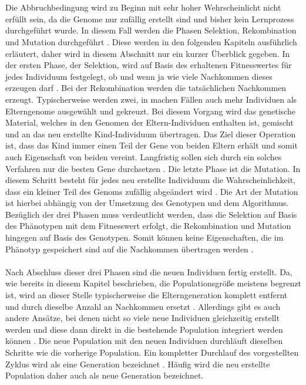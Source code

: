 \\\\
Die Abbruchbedingung wird zu Beginn mit sehr hoher Wehrscheinlicht nicht erfüllt sein, da die Genome nur zufällig erstellt sind und bisher kein Lernprozess durchgeführt wurde. In diesem Fall werden die Phasen Selektion, Rekombination und Mutation durchgeführt \cite{rothlauf2006representation}. Diese werden in den folgenden Kapiteln ausführlich erläutert, daher wird in diesem Abschnitt nur ein kurzer Überblick gegeben. In der ersten Phase, der Selektion, wird auf Basis des erhaltenen Fitnesswertes für jedes Individuum festgelegt, ob und wenn ja wie viele Nachkommen dieses erzeugen darf \cite{weicker2015evolutionare}. Bei der Rekombination werden die tatsächlichen Nachkommen erzeugt. Typischerweise werden zwei, in machen Fällen auch mehr Individuen als Elterngenome ausgewählt und gekreuzt. Bei diesem Vorgang wird das genetische Material, welches in den Genomen der Eltern-Individuen enthalten ist, gemischt und an das neu erstellte Kind-Individuum übertragen. Das Ziel dieser Operation ist, dass das Kind immer einen Teil der Gene von beiden Eltern erhält und somit auch Eigenschaft von beiden vereint. Langfristig sollen sich durch ein solches Verfahren nur die besten Gene durchsetzen \cite{weicker2015evolutionare}. 
Die letzte Phase ist die Mutation. In diesem Schritt besteht für jedes neu erstellte Individuum die Wahrscheinlichkeit, dass ein kleiner Teil des Genoms zufällig abgeändert wird \cite{rojas1996neural}. Die Art der Mutation ist hierbei abhängig von der Umsetzung des Genotypen und dem Algorithmus. Bezüglich der drei Phasen muss verdeutlicht werden, dass die Selektion auf Basis des Phänotypen mit dem Fitnesswert erfolgt, die Rekombination und Mutation hingegen auf Basis des Genotypen. Somit können keine Eigenschaften, die im Phänotyp gespeichert sind auf die Nachkommen übertragen werden \cite{rothlauf2006representation}.
\\\\
Nach Abschluss dieser drei Phasen sind die neuen Individuen fertig erstellt. Da, wie bereits in diesem Kapitel beschrieben, die Populationsgröße meistens begrenzt ist, wird an dieser Stelle typischerweise die Elterngeneration komplett entfernt und durch dieselbe Anzahl an Nachkommen ersetzt \cite{weicker2015evolutionare}. Allerdings gibt es auch andere Ansätze, bei denen nicht so viele neue Individuen gleichzeitig erstellt werden und diese dann direkt in die bestehende Population integriert werden können \cite{stanley2005real}. Die neue Population mit den neuen Individuen durchläuft dieselben Schritte wie die vorherige Population. Ein kompletter Durchlauf des vorgestellten Zyklus wird als eine Generation bezeichnet \cite{weicker2015evolutionare}. Häufig wird die neu erstellte Population daher auch als neue Generation bezeichnet. 

